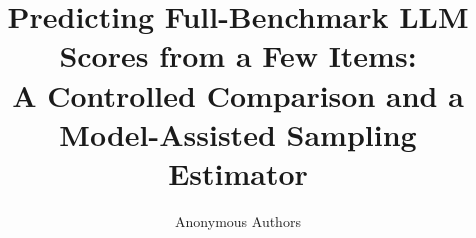\documentclass{article}
\title{Predicting Full-Benchmark LLM Scores from a Few Items: \\ A Controlled Comparison and a Model-Assisted Sampling Estimator}
\author{Anonymous Authors}
\begin{document}
\maketitle

\begin{abstract}

\end{abstract}










\appendix



\end{document}
